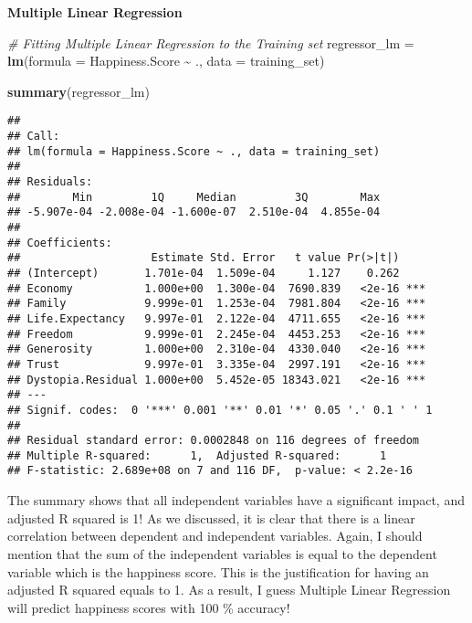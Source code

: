 \documentclass[
]{article}
\newenvironment{Shaded}{\begin{snugshade}}{\end{snugshade}}
\newcommand{\AttributeTok}[1]{\textcolor[rgb]{0.13,0.29,0.53}{#1}}
\newcommand{\CommentTok}[1]{\textcolor[rgb]{0.56,0.35,0.01}{\textit{#1}}}
\newcommand{\FunctionTok}[1]{\textcolor[rgb]{0.13,0.29,0.53}{\textbf{#1}}}
\newcommand{\NormalTok}[1]{#1}
\newcommand{\OtherTok}[1]{\textcolor[rgb]{0.56,0.35,0.01}{#1}}
\newcommand{\SpecialCharTok}[1]{\textcolor[rgb]{0.81,0.36,0.00}{\textbf{#1}}}
\begin{document}
\textbf{Multiple Linear Regression}

\begin{Shaded}
\begin{Highlighting}[]
\CommentTok{\# Fitting Multiple Linear Regression to the Training set}
\NormalTok{regressor\_lm }\OtherTok{=} \FunctionTok{lm}\NormalTok{(}\AttributeTok{formula =}\NormalTok{ Happiness.Score }\SpecialCharTok{\textasciitilde{}}\NormalTok{ .,}
               \AttributeTok{data =}\NormalTok{ training\_set)}

\FunctionTok{summary}\NormalTok{(regressor\_lm)}
\end{Highlighting}
\end{Shaded}

\begin{verbatim}
## 
## Call:
## lm(formula = Happiness.Score ~ ., data = training_set)
## 
## Residuals:
##        Min         1Q     Median         3Q        Max 
## -5.907e-04 -2.008e-04 -1.600e-07  2.510e-04  4.855e-04 
## 
## Coefficients:
##                    Estimate Std. Error   t value Pr(>|t|)    
## (Intercept)       1.701e-04  1.509e-04     1.127    0.262    
## Economy           1.000e+00  1.300e-04  7690.839   <2e-16 ***
## Family            9.999e-01  1.253e-04  7981.804   <2e-16 ***
## Life.Expectancy   9.997e-01  2.122e-04  4711.655   <2e-16 ***
## Freedom           9.999e-01  2.245e-04  4453.253   <2e-16 ***
## Generosity        1.000e+00  2.310e-04  4330.040   <2e-16 ***
## Trust             9.997e-01  3.335e-04  2997.191   <2e-16 ***
## Dystopia.Residual 1.000e+00  5.452e-05 18343.021   <2e-16 ***
## ---
## Signif. codes:  0 '***' 0.001 '**' 0.01 '*' 0.05 '.' 0.1 ' ' 1
## 
## Residual standard error: 0.0002848 on 116 degrees of freedom
## Multiple R-squared:      1,  Adjusted R-squared:      1 
## F-statistic: 2.689e+08 on 7 and 116 DF,  p-value: < 2.2e-16
\end{verbatim}

The summary shows that all independent variables have a significant
impact, and adjusted R squared is 1! As we discussed, it is clear that
there is a linear correlation between dependent and independent
variables. Again, I should mention that the sum of the independent
variables is equal to the dependent variable which is the happiness
score. This is the justification for having an adjusted R squared equals
to 1. As a result, I guess Multiple Linear Regression will predict
happiness scores with 100 \% accuracy!
\end{document}
